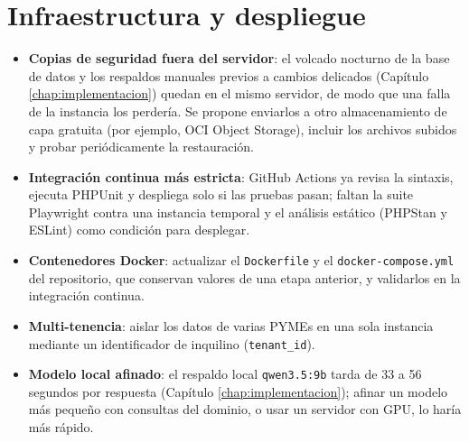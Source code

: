 \section{Infraestructura y despliegue}
\begin{itemize}
    \item \textbf{Copias de seguridad fuera del servidor}: el volcado nocturno de la base de datos y los respaldos manuales previos a cambios delicados (Capítulo \ref{chap:implementacion}) quedan en el mismo servidor, de modo que una falla de la instancia los perdería. Se propone enviarlos a otro almacenamiento de capa gratuita (por ejemplo, OCI Object Storage), incluir los archivos subidos y probar periódicamente la restauración.
    \item \textbf{Integración continua más estricta}: GitHub Actions ya revisa la sintaxis, ejecuta PHPUnit y despliega solo si las pruebas pasan; faltan la suite Playwright contra una instancia temporal y el análisis estático (PHPStan y ESLint) como condición para desplegar.
    \item \textbf{Contenedores Docker}: actualizar el \texttt{Dockerfile} y el \texttt{docker-compose.yml} del repositorio, que conservan valores de una etapa anterior, y validarlos en la integración continua.
    \item \textbf{Multi-tenencia}: aislar los datos de varias PYMEs en una sola instancia mediante un identificador de inquilino (\texttt{tenant\_id}).
    \item \textbf{Modelo local afinado}: el respaldo local \texttt{qwen3.5:9b} tarda de 33 a 56 segundos por respuesta (Capítulo \ref{chap:implementacion}); afinar un modelo más pequeño con consultas del dominio, o usar un servidor con GPU, lo haría más rápido.
\end{itemize}

